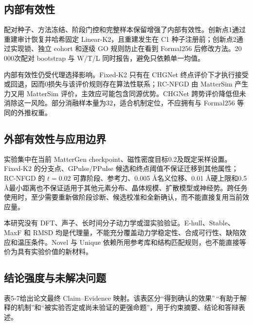 \subsection{内部有效性}

配对种子、方法冻结、阶段门控和完整样本保留增强了内部有效性。创新点1通过重建审计恢复并哈希固定 Linear-K2，且重建发生在 C1 种子注册前；创新点2通过实现锁、独立 cohort 和逐级 GO 规则防止在看到 Formal256 后修改方法。20 000次配对 bootstrap 与 W/T/L 同时报告，避免只依赖单一均值。

内部有效性仍受代理选择影响。Fixed-K2 只有在 CHGNet 终点评价下才执行接受或回退，因而0损失与该评价规则存在算法性联系；RC-NFGD 由 Matter\allowbreak Sim 产生力又用 Matter\allowbreak Sim 评价，主效应可能包含同源优势。CHGNet 跨势评价降低但未消除这一风险。部分消融样本量为32，适合机制定位，不应拥有与 Formal256 等同的外推权重。

\subsection{外部有效性与应用边界}

实验集中在当前 MatterGen checkpoint、磁性密度目标0.2及既定采样设置。Fixed-K2 的分支点、GPulse/PPulse 候选和终点阈值不保证迁移到其他属性；RC-NFGD 的 \(t=0.02\) 可靠阶段、参考力、0.005 Å名义位移、0.01 Å硬上限和0.5 Å最小距离也不保证适用于其他元素分布、晶体规模、扩散模型或神经势。跨任务使用时，至少需要重新做阶段诊断、候选校准和全新确认，而不能直接复用当前效应量。

本研究没有 DFT、声子、长时间分子动力学或湿实验验证。E-hull、Stable、MaxF 和 RMSD 均是代理量，不能充分覆盖动力学稳定性、合成可行性、缺陷效应和温压条件。Novel 与 Unique 依赖所用参考库和结构匹配规则，也不能直接等价为具有实验价值的新材料。

\subsection{结论强度与未解决问题}

表5-7给出论文最终 Claim--Evidence 映射。该表区分``得到确认的效果''\,``有助于解释的机制''和``被实验否定或尚未验证的更强命题''，用于约束摘要、结论和答辩表述。


